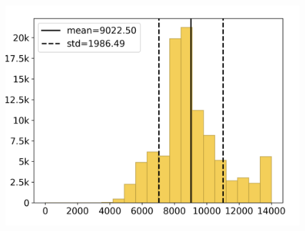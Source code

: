 \begin{figure}[H]
\begin{minipage}{.325\textwidth}
	\end{minipage}
	\begin{minipage}{.325\textwidth}
		\includegraphics[width=\textwidth, clip, trim=.25cm 0.25cm .25cm 0.25cm]{Resources/Images/Images/Histogram/hist_3_a.png}
	\end{minipage}
	

\end{figure}
